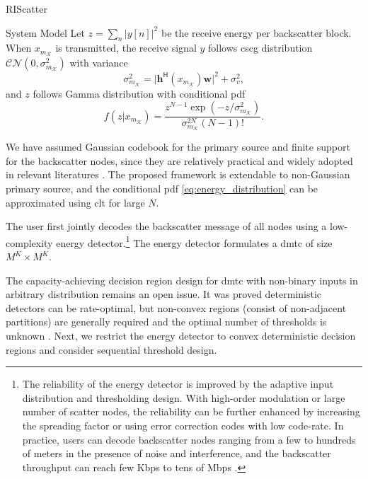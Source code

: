 \begin{section}{RIScatter}
\begin{subsection}{System Model}
		Let $z=\sum_{n} \bigl\lvert y[n] \bigr\rvert^2$ be the receive energy per backscatter block.
		When $x_{m_\mathcal{K}}$ is transmitted, the receive signal $y$ follows \gls{cscg} distribution $\mathcal{CN}(0,\sigma_{m_{\mathcal{K}}}^2)$ with variance
		\begin{equation}
			\sigma_{m_{\mathcal{K}}}^2 = \lvert \mathbf{h}^\mathsf{H}(x_{m_{\mathcal{K}}}) \mathbf{w} \rvert^2 + \sigma_v^2,
			\label{eq:receive_variance}
		\end{equation}
		and $z$ follows Gamma distribution with conditional \gls{pdf}
		\begin{equation}
			f(z|x_{m_{\mathcal{K}}}) = \frac{z^{N-1} \exp(-z/\sigma_{m_{\mathcal{K}}}^2)}{\sigma_{m_{\mathcal{K}}}^{2N} (N-1)!}.
			\label{eq:energy_distribution}
		\end{equation}

		\begin{remark}
			We have assumed Gaussian codebook for the primary source and finite support for the backscatter nodes, since they are relatively practical and widely adopted in relevant literatures \cite{Qian2019b,Xu2020b,Zhang2021d,Hua2022,Hu2021a,Qian2019}.
			The proposed framework is extendable to non-Gaussian primary source, and the conditional \gls{pdf} \eqref{eq:energy_distribution} can be approximated using \gls{clt} for large $N$.
			\label{re:non_gaussian}
		\end{remark}

		The user first jointly decodes the backscatter message of all nodes using a low-complexity energy detector.\footnote{The reliability of the energy detector is improved by the adaptive input distribution and thresholding design. With high-order modulation or large number of scatter nodes, the reliability can be further enhanced by increasing the spreading factor or using error correction codes with low code-rate. In practice, users can decode backscatter nodes ranging from a few to hundreds of meters in the presence of noise and interference, and the backscatter throughput can reach few Kbps to tens of Mbps \cite{Wu2022e}.\label{fn:energy_detector}}
		The energy detector formulates a \gls{dmtc} of size $M^K \times M^K$.

		\begin{remark}
			The capacity-achieving decision region design for \gls{dmtc} with non-binary inputs in arbitrary distribution remains an open issue.
			It was proved deterministic detectors can be rate-optimal, but non-convex regions (consist of non-adjacent partitions) are generally required and the optimal number of thresholds is unknown \cite{Nguyen2018,Nguyen2021}.
			Next, we restrict the energy detector to convex deterministic decision regions and consider sequential threshold design.
		\end{remark}


\end{subsection}
\end{section}
